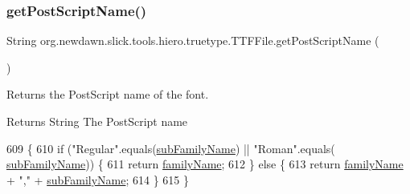\subsubsection{\texorpdfstring{get\+Post\+Script\+Name()}{getPostScriptName()}}
{\footnotesize\ttfamily String org.\+newdawn.\+slick.\+tools.\+hiero.\+truetype.\+T\+T\+F\+File.\+get\+Post\+Script\+Name (\begin{DoxyParamCaption}{ }\end{DoxyParamCaption})\hspace{0.3cm}{\ttfamily [inline]}}

Returns the Post\+Script name of the font. \begin{DoxyReturn}{Returns}
String The Post\+Script name 
\end{DoxyReturn}

\begin{DoxyCode}
609                                       \{
610         \textcolor{keywordflow}{if} (\textcolor{stringliteral}{"Regular"}.equals(\mbox{\hyperlink{classorg_1_1newdawn_1_1slick_1_1tools_1_1hiero_1_1truetype_1_1_t_t_f_file_a5584d310e65c24aa3ea85ce0afe13401}{subFamilyName}}) || \textcolor{stringliteral}{"Roman"}.equals(
      \mbox{\hyperlink{classorg_1_1newdawn_1_1slick_1_1tools_1_1hiero_1_1truetype_1_1_t_t_f_file_a5584d310e65c24aa3ea85ce0afe13401}{subFamilyName}})) \{
611             \textcolor{keywordflow}{return} \mbox{\hyperlink{classorg_1_1newdawn_1_1slick_1_1tools_1_1hiero_1_1truetype_1_1_t_t_f_file_a9888cb4831ec8b916a0a8ac0f6865bbe}{familyName}};
612         \} \textcolor{keywordflow}{else} \{
613             \textcolor{keywordflow}{return} \mbox{\hyperlink{classorg_1_1newdawn_1_1slick_1_1tools_1_1hiero_1_1truetype_1_1_t_t_f_file_a9888cb4831ec8b916a0a8ac0f6865bbe}{familyName}} + \textcolor{stringliteral}{","} + \mbox{\hyperlink{classorg_1_1newdawn_1_1slick_1_1tools_1_1hiero_1_1truetype_1_1_t_t_f_file_a5584d310e65c24aa3ea85ce0afe13401}{subFamilyName}};
614         \}
615     \}
\end{DoxyCode}
\mbox{\label{classorg_1_1newdawn_1_1slick_1_1tools_1_1hiero_1_1truetype_1_1_t_t_f_file_a858081e85304d6831a316f1f2f058d37}} 
